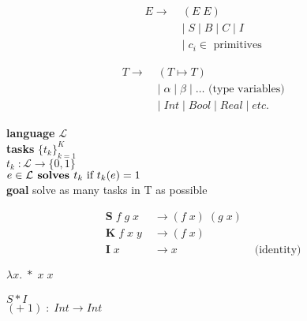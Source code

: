 \documentclass{article}
\begin{document}


\begin{align}
E \rightarrow \;  &( E \; E ) \\
 & |\; S \;|\; B \;| \;C \;| \;I \\ 
 & |\; c_i \in \text{ primitives }
\end{align}

\begin{align}
T \rightarrow \;  &( T \mapsto  T ) \\
 & |\; \alpha \;|\; \beta \;|\; \dots \text{ (type variables) }\\
 & |\; Int \;|\; Bool \;| \; Real \;| \; etc.
\end{align}


\textbf{language} $\mathcal{L}$\\
 
\textbf{tasks} $\{t_k\}_{k=1}^K$\\

$t_k \; : \mathcal{L} \rightarrow \{0, 1\}$\\

$e \in \mathcal{L} \text{\textbf{ solves }} t_k \text{ if } t_k(e) =
1$\\

\textbf{goal} solve as many tasks in T as possible

\begin{align}
\mathbf{S}\; f\; g\; x\; &\rightarrow (f\; x)\; (g\; x)\\ 
\mathbf{K}\; f\; x\; y\; &\rightarrow (f\; x)\\ 
\mathbf{I}\; x &\rightarrow  x & \text{ (identity) }
\end{align}

$\lambda x. \; * \; x \; x$\\\\

$S * I $\\

$(+ \; 1)\; : \; Int \rightarrow Int$\\
\end{document}
